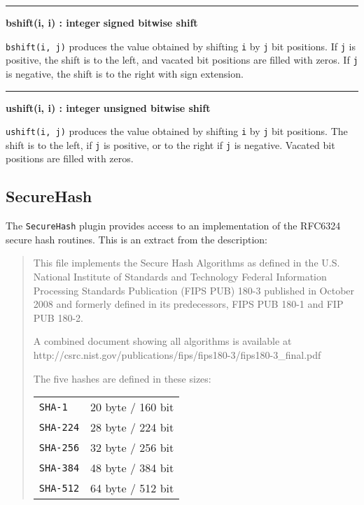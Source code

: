 \bigskip\hrule\vspace{0.1cm}
\noindent
{\bf bshift(i, i) : integer } \hfill {\bf signed bitwise shift}

\noindent
{}\texttt{bshift(i, j)} produces the value obtained by
shifting \texttt{i} by \texttt{j} bit positions.
If \texttt{j} is positive, the shift is to the left, and vacated bit
positions are filled with zeros.
If \texttt{j} is negative, the shift is to the right with sign extension.

\bigskip\hrule\vspace{0.1cm}
\noindent
{\bf ushift(i, i) : integer } \hfill {\bf unsigned bitwise shift}

\noindent
{}\texttt{ushift(i, j)} produces the value obtained by
shifting \texttt{i} by \texttt{j} bit positions.
The shift is to the left, if \texttt{j} is positive, or to the right if
\texttt{j} is negative.  Vacated bit positions are filled with zeros.

\subsection{SecureHash}
The \texttt{SecureHash} plugin provides access to an implementation of the
RFC6324 secure hash routines. This is an extract from the description:
\begin{quote}
{\small
  This file implements the Secure Hash Algorithms
  as defined in the U.S. National Institute of Standards
  and Technology Federal Information Processing Standards
  Publication (FIPS PUB) 180-3 published in October 2008
  and formerly defined in its predecessors, FIPS PUB 180-1
  and FIP PUB 180-2.

  A combined document showing all algorithms is available at\\
  http://csrc.nist.gov/publications/fips/fips180-3/fips180-3\_final.pdf

  The five hashes are defined in these sizes:\\
  \begin{xtabular}{m{1.0in}m{3.0in}}
      \texttt{SHA-1}       &    20 byte / 160 bit\\
     \texttt{SHA-224}     &    28 byte / 224 bit\\
     \texttt{SHA-256}     &    32 byte / 256 bit\\
     \texttt{SHA-384}     &    48 byte / 384 bit\\
     \texttt{SHA-512}     &    64 byte / 512 bit\\
   \end{xtabular}
}
\end{quote}

